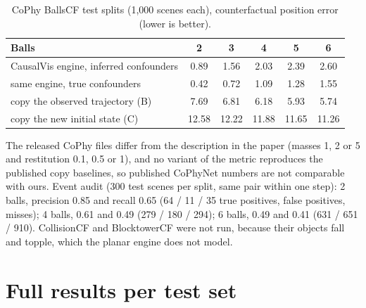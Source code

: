 \documentclass[10pt,onecolumn,letterpaper]{article}
\newcommand{\sys}{CausalVis}
\begin{document}
\begin{table}[h]
\caption{CoPhy BallsCF test splits (1,000 scenes each), counterfactual position error (lower is better).}
\label{tab:cophy}
\centering
\small
\begin{tabular}{@{}lccccc@{}}
\toprule
Balls & 2 & 3 & 4 & 5 & 6 \\
\midrule
\sys{} engine, inferred confounders & 0.89 & 1.56 & 2.03 & 2.39 & 2.60 \\
same engine, true confounders & 0.42 & 0.72 & 1.09 & 1.28 & 1.55 \\
copy the observed trajectory (B) & 7.69 & 6.81 & 6.18 & 5.93 & 5.74 \\
copy the new initial state (C) & 12.58 & 12.22 & 11.88 & 11.65 & 11.26 \\
\bottomrule
\end{tabular}
\end{table}

The released CoPhy files differ from the description in the paper (masses 1, 2 or 5 and restitution 0.1, 0.5 or 1), and no variant of the metric reproduces the published copy baselines, so published CoPhyNet numbers are not comparable with ours.
Event audit (300 test scenes per split, same pair within one step): 2 balls, precision 0.85 and recall 0.65 (64 / 11 / 35 true positives, false positives, misses); 4 balls, 0.61 and 0.49 (279 / 180 / 294); 6 balls, 0.49 and 0.41 (631 / 651 / 910).
CollisionCF and BlocktowerCF were not run, because their objects fall and topple, which the planar engine does not model.

\section{Full results per test set}
\label{app:full}
\end{document}
